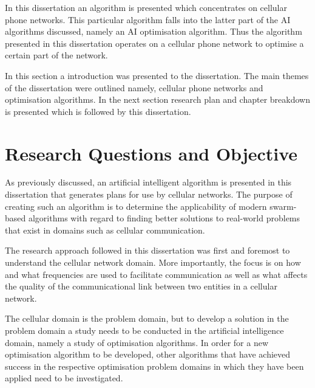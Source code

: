 In this dissertation an algorithm is presented which concentrates on cellular phone networks. This particular algorithm falls into the latter part of the AI algorithms discussed, namely an AI optimisation algorithm. Thus the algorithm presented in this dissertation operates on a cellular phone network to optimise a certain part of the network.

In this section a introduction was presented to the dissertation. The main themes of the dissertation were outlined namely, cellular phone networks and optimisation algorithms. In the next section research plan and chapter breakdown is presented which is followed by this dissertation.
\section{Research Questions and Objective}
As previously discussed, an artificial intelligent algorithm is presented in this dissertation that generates plans for use by cellular networks. The purpose of creating such an algorithm is to determine the applicability of modern swarm-based algorithms with regard to finding better solutions to real-world problems that exist in domains such as cellular communication.

The research approach followed in this dissertation was first and foremost to understand the cellular network domain. More importantly, the focus is on how and what frequencies are used to facilitate communication as well as what affects the quality of the communicational link between two entities in a cellular network. 

The cellular domain is the problem domain, but to develop a solution in the problem domain a study needs to be conducted in the artificial intelligence domain, namely a study of optimisation algorithms. In order for a new optimisation algorithm to be developed, other algorithms that have achieved success in the respective optimisation problem domains in which they have been applied need to be investigated.


